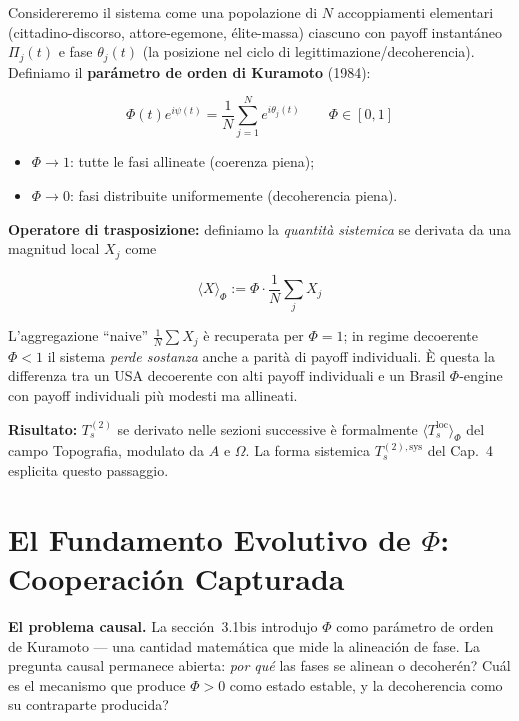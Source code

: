\Hypoth{} Considereremo il sistema come una popolazione di \(N\)
accoppiamenti elementari (cittadino-discorso, attore-egemone,
élite-massa) ciascuno con payoff instantáneo \(\Pi_j(t)\) e fase
\(\theta_j(t)\) (la posizione nel ciclo di legittimazione/decoherencia).
Definiamo il \textbf{parámetro de orden di Kuramoto} (1984):

\[
\Phi(t) e^{i\psi(t)} = \frac{1}{N}\sum_{j=1}^{N} e^{i\theta_j(t)} \qquad \Phi \in [0, 1]
\]

\begin{itemize}
\tightlist
\item
  \(\Phi \to 1\): tutte le fasi allineate (coerenza piena);
\item
  \(\Phi \to 0\): fasi distribuite uniformemente (decoherencia piena).
\end{itemize}

\Hypoth{} \textbf{Operatore di trasposizione:} definiamo la
\emph{quantità sistemica} se derivata da una magnitud local \(X_j\) come

\[
\langle X \rangle_\Phi := \Phi \cdot \frac{1}{N}\sum_j X_j
\]

L'aggregazione ``naive'' \(\frac{1}{N}\sum X_j\) è recuperata per
\(\Phi = 1\); in regime decoerente \(\Phi < 1\) il sistema \emph{perde
sostanza} anche a parità di payoff individuali. È questa la differenza
tra un USA decoerente con alti payoff individuali e un Brasil
\(\Phi\)-engine con payoff individuali più modesti ma allineati.

\Proved{} \textbf{Risultato:} \(T_s^{(2)}\) se derivato nelle sezioni
successive è formalmente \(\langle T_s^{\text{loc}}\rangle_\Phi\) del
campo Topografia, modulato da \(A\) e \(\Omega\). La forma sistemica
\(T_s^{(2),\text{sys}}\) del Cap.~4 esplicita questo passaggio.



\section{\texorpdfstring{El Fundamento Evolutivo de \(\Phi\): Cooperaci\'{o}n Capturada}{El Fundamento Evolutivo de Phi: Cooperacion Capturada}}\label{il-fondamento-evolutivo-di-phi}

\Hypoth{} \textbf{El problema causal.} La secci\'{o}n~3.1bis introdujo
\(\Phi\) como par\'{a}metro de orden de Kuramoto --- una cantidad
matem\'{a}tica que mide la alineaci\'{o}n de fase. La pregunta causal
permanece abierta: \emph{por qu\'{e}} las fases se alinean o
decoher\'{e}n? Cu\'{a}l es el mecanismo que produce \(\Phi > 0\) como
estado estable, y la decoherencia como su contraparte producida?

